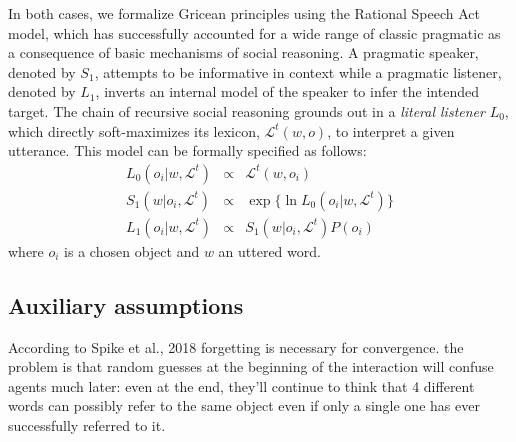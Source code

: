In both cases, we formalize Gricean principles using the Rational Speech Act model, which has successfully accounted for a wide range of classic pragmatic as a consequence of basic mechanisms of social reasoning. 
A pragmatic speaker, denoted by $S_1$, attempts to be informative in context while a pragmatic listener, denoted by $L_1$, inverts an internal model of the speaker to infer the intended target. 
The chain of recursive social reasoning grounds out in a \emph{literal listener} $L_0$, which directly soft-maximizes its lexicon, $\mathcal{L}^t(w,o)$, to interpret a given utterance. 
This model can be formally specified as follows:
$$
\begin{array}{rcl}
L_0(o_i | w, \mathcal{L}^t) &\propto  & \mathcal{L}^t(w,o_i) \\
S_1(w | o_i, \mathcal{L}^t) &\propto & \exp\{\ln L_0(o_i | w, \mathcal{L}^t)\} \\
L_1(o_i | w, \mathcal{L}^t) &\propto  & S_1(w | o_i, \mathcal{L}^t) P(o_i) 
\end{array}
$$
where $o_i$ is a chosen object and $w$ an uttered word.

\subsection{Auxiliary assumptions}


According to Spike et al., 2018 forgetting is necessary for convergence. the problem is that random guesses at the beginning of the interaction will confuse agents much later: even at the end, they'll continue to think that 4 different words can possibly refer to the same object even if only a single one has ever successfully referred to it. 
